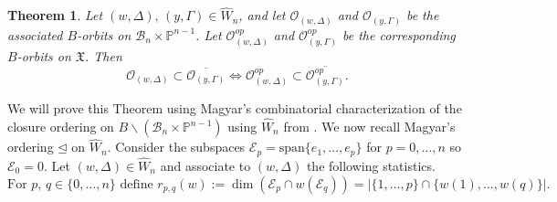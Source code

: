 \documentclass[12pt]{amsart}
\numberwithin{equation}{section}
\newtheorem{thm}{Theorem}[section]
\newcommand{\cW}{{ W}}
\newcommand{\B}{\mathcal{B}}
\begin{document}
\begin{thm}\label{thm:globalclosure}
Let $(w,\Delta),\, (y,\Gamma)\in\widehat{W}_{n}$, and let 
$\mathcal{O}_{(w,\Delta)}$ and $\mathcal{O}_{(y,\Gamma)}$ be the associated $B$-orbits on $\B_{n}\times\mathbb{P}^{n-1}$.  Let $\mathcal{O}_{(w,\Delta)}^{op}$ and 
$\mathcal{O}_{(y,\Gamma)}^{op}$ be the corresponding $B$-orbits on $\mathfrak{X}$.  
Then 
\begin{equation}\label{eq:preserveclosure}
\mathcal{O}_{(w,\Delta)}\subset\overline{\mathcal{O}_{(y,\Gamma)}}\Leftrightarrow \mathcal{O}_{(w,\Delta)}^{op}\subset\overline{\mathcal{O}_{(y,\Gamma)}^{op}}.
\end{equation}
\end{thm}
We will prove this Theorem using Magyar's combinatorial characterization of the closure ordering on $B\backslash(\B_{n}\times\mathbb{P}^{n-1})$ using $\widehat{\cW}_{n}$ from \cite{Magyar}.
We now recall Magyar's ordering $\unlhd$ on $\widehat{\cW}_{n}.$  Consider the subspaces $\mathcal{E}_{p}=\mbox{span}\{e_{1},\dots, e_{p}\}$ for $p=0, \dots, n$ so ${\mathcal{E}}_{0}=0.$  Let 
$(w,\Delta)\in\widehat{\cW}_{n}$ and associate to $(w,\Delta)$ the following statistics.
\begin{equation}\label{eq:firststat}
\mbox{For } p,\, q\in\{0,\dots, n\}\mbox{ define } r_{p,q}(w):=\dim(\mathcal{E}_{p}\cap w(\mathcal{E}_{q}))=|\{1,\dots, p\}\cap \{w(1),\dots, w(q)\}|.
\end{equation}    
\end{document}
